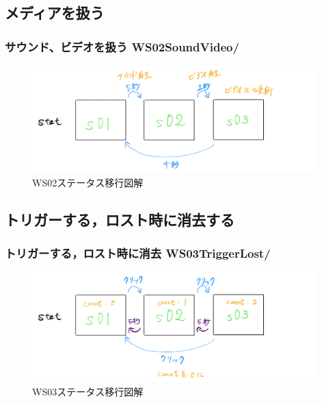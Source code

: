\documentclass[10pt, dvipdfmx]{beamer}
\begin{document}
    \subsection{メディアを扱う}
        \begin{frame}
            \frametitle{サウンド、ビデオを扱う WS02SoundVideo/}
            \begin{figure}[htb]
                 \includegraphics[width=110mm]{images/ws02-1.png}
                 \caption{WS02ステータス移行図解}
                \label{fig:13}
            \end{figure}
        \end{frame}

    \subsection{トリガーする，ロスト時に消去する}
        \begin{frame}
            \frametitle{トリガーする，ロスト時に消去 WS03TriggerLost/}
            \begin{figure}[htb]
                 \includegraphics[width=110mm]{images/ws03-1.png}
                 \caption{WS03ステータス移行図解}
                \label{fig:14}
            \end{figure}
        \end{frame}
\end{document}
